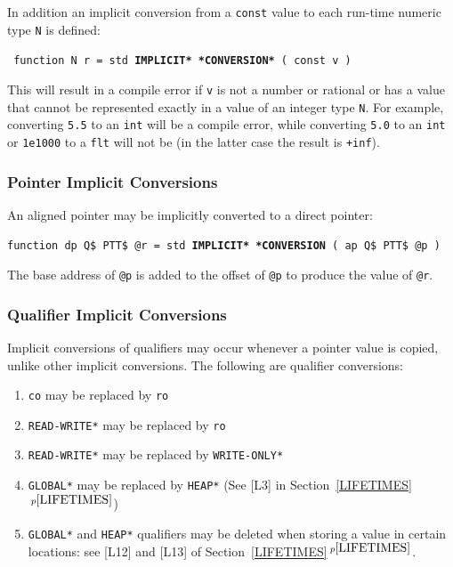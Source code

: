 \documentclass[12pt]{article}
\newcommand{\ttkey}[1]{{\tt \bfseries #1}}
\newcommand{\itemref}[1]{\ref{#1}$\,^{p\pageref{#1}}$}
\newenvironment{indpar}[1][0.3in]%
	{\begin{list}{}%
		     {\setlength{\itemsep}{0in}%
		      \setlength{\topsep}{0in}%
		      \setlength{\parsep}{1ex}%
		      \setlength{\labelwidth}{#1}%
		      \setlength{\leftmargin}{#1}%
		      \addtolength{\leftmargin}{\labelsep}}%
	 \item}%
	{\end{list}}
\begin{document}
In addition an implicit conversion from a {\tt const} value
to each run-time numeric type {\tt N} is defined:
\begin{indpar} \tt
function N r = std \ttkey{*IMPLICIT* *CONVERSION*} ( const v )
\end{indpar}
This will result in a compile error if {\tt v} is not a number
or rational or has a value that cannot be represented
exactly in a value of an integer type {\tt N}.
For example, converting {\tt 5.5} to an {\tt int} will be a compile
error, while converting {\tt 5.0} to an {\tt int} or {\tt 1e1000}
to a {\tt flt} will not be (in the latter case the result is {\tt +inf}).

\subsubsection{Pointer Implicit Conversions}
\label{POINTER-IMPLICIT-CONVERSIONS}

An aligned pointer may be implicitly converted to a direct pointer:

\begin{indpar}
{\tt function dp Q\$ PTT\$ @r =
    std \ttkey{*IMPLICIT* *CONVERSION} ( ap Q\$ PTT\$ @p )}
\begin{indpar}
The base address of {\tt @p} is added to the offset of {\tt @p} to
produce the value of {\tt @r}.
\end{indpar}
\end{indpar}

\subsubsection{Qualifier Implicit Conversions}
\label{QUALIFIER-IMPLICIT-CONVERSIONS}

Implicit conversions of qualifiers may occur whenever a pointer
value is copied, unlike other implicit conversions.
The following are qualifier conversions:
\begin{indpar}
\begin{enumerate}
\item {\tt co} may be replaced by {\tt ro}
\item {\tt *READ-WRITE*} may be replaced by {\tt ro}
\item {\tt *READ-WRITE*} may be replaced by {\tt *WRITE-ONLY*}
\item {\tt *GLOBAL*} may be replaced by {\tt *HEAP*} (See [L3] in
Section~\itemref{LIFETIMES})
\item {\tt *GLOBAL*} and {\tt *HEAP*} qualifiers may be deleted
when storing a value in certain locations: see [L12] and [L13]
of Section~\itemref{LIFETIMES}.

\end{enumerate}
\end{indpar}
\end{document}

